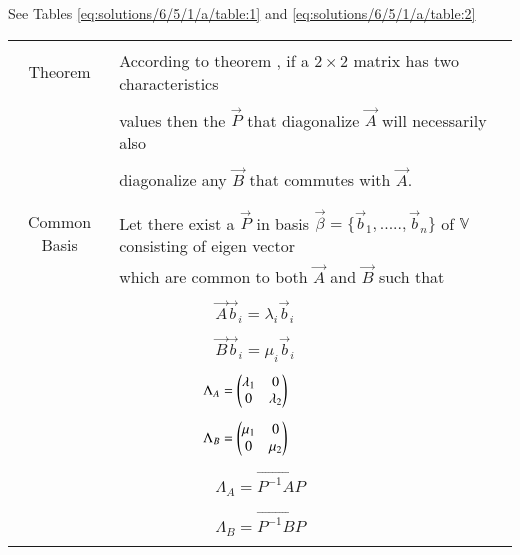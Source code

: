 See Tables 
    \ref{eq:solutions/6/5/1/a/table:1} and 
    \ref{eq:solutions/6/5/1/a/table:2}
%
\begin{table*}[ht!]
\centering
\begin{tabular}{|c|l|}
   
	\hline
	\multirow{3}{*}{Theorem}
    &\\
    & According  to theorem , if a $2\times 2$ matrix has two characteristics \\
    &\\
    & values then the $\vec{P}$ that diagonalize $\vec{A}$ will
    necessarily also   \\
    &\\
    & diagonalize any $\vec{B}$ that commutes with $\vec{A}$. \\
    &\\
    \hline 
    &\\
    Common Basis
    &Let there exist a $\vec{P}$ in basis $\vec{\beta}=\{\vec{b}_1,.....,\vec{b}_n\}$ of $\mathbb{V}$ consisting of eigen vector\\& which are common to both $\vec{A}$ and $\vec{B}$ such that\\
    &\\
    &$\qquad\qquad\qquad\vec{A}\vec{b}_i=\lambda_{i}\vec{b}_i$\\
    &\\
    &$\qquad\qquad\qquad\vec{B}\vec{b}_i=\mu_{i}\vec{b}_i$\\
    &\\
    &$\qquad\qquad\qquad\Lambda_{A}=\begin{pmatrix}\lambda_1&0\\0&\lambda_2\end{pmatrix}$\\
    &\\
    &$\qquad\qquad\qquad\Lambda_{B}=\begin{pmatrix}\mu_1&0\\0&\mu_2\end{pmatrix}$\\
    &\\
    &$\qquad\qquad\qquad\Lambda_{A}=\vec{P^{-1}AP}$\\
    &\\
    &$\qquad\qquad\qquad\Lambda_{B}=\vec{P^{-1}BP}$\\
    &\\
    \hline

    
\end{tabular}
    \caption{Theorems }
\label{eq:solutions/6/5/1/a/table:1}
\end{table*}
\onecolumn
